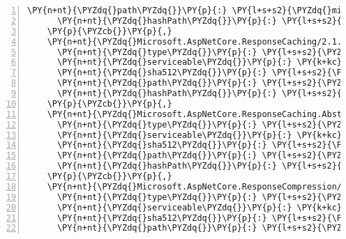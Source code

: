 \begin{Verbatim}[commandchars=\\\{\},numbers=left,firstnumber=1,stepnumber=1,numberblanklines=0]
      \PY{n+nt}{\PYZdq{}path\PYZdq{}}\PY{p}{:} \PY{l+s+s2}{\PYZdq{}microsoft.aspnetcore.razor.runtime/2.1.0\PYZhy{}rc1\PYZhy{}final\PYZdq{}}\PY{p}{,}
      \PY{n+nt}{\PYZdq{}hashPath\PYZdq{}}\PY{p}{:} \PY{l+s+s2}{\PYZdq{}microsoft.aspnetcore.razor.runtime.2.1.0\PYZhy{}rc1\PYZhy{}final.nupkg.sha512\PYZdq{}}
    \PY{p}{\PYZcb{}}\PY{p}{,}
    \PY{n+nt}{\PYZdq{}Microsoft.AspNetCore.ResponseCaching/2.1.0\PYZhy{}rc1\PYZhy{}final\PYZdq{}}\PY{p}{:} \PY{p}{\PYZob{}}
      \PY{n+nt}{\PYZdq{}type\PYZdq{}}\PY{p}{:} \PY{l+s+s2}{\PYZdq{}package\PYZdq{}}\PY{p}{,}
      \PY{n+nt}{\PYZdq{}serviceable\PYZdq{}}\PY{p}{:} \PY{k+kc}{true}\PY{p}{,}
      \PY{n+nt}{\PYZdq{}sha512\PYZdq{}}\PY{p}{:} \PY{l+s+s2}{\PYZdq{}sha512\PYZhy{}iGd5YsaPKBG5GvNAe3YwbBx6Q1BJUcCQHdq9n57qWkb+z+R8Dj1hXf94DpMLOw90IJtC0UFMkmOYIj6QCoo7Mg==\PYZdq{}}\PY{p}{,}
      \PY{n+nt}{\PYZdq{}path\PYZdq{}}\PY{p}{:} \PY{l+s+s2}{\PYZdq{}microsoft.aspnetcore.responsecaching/2.1.0\PYZhy{}rc1\PYZhy{}final\PYZdq{}}\PY{p}{,}
      \PY{n+nt}{\PYZdq{}hashPath\PYZdq{}}\PY{p}{:} \PY{l+s+s2}{\PYZdq{}microsoft.aspnetcore.responsecaching.2.1.0\PYZhy{}rc1\PYZhy{}final.nupkg.sha512\PYZdq{}}
    \PY{p}{\PYZcb{}}\PY{p}{,}
    \PY{n+nt}{\PYZdq{}Microsoft.AspNetCore.ResponseCaching.Abstractions/2.1.0\PYZhy{}rc1\PYZhy{}final\PYZdq{}}\PY{p}{:} \PY{p}{\PYZob{}}
      \PY{n+nt}{\PYZdq{}type\PYZdq{}}\PY{p}{:} \PY{l+s+s2}{\PYZdq{}package\PYZdq{}}\PY{p}{,}
      \PY{n+nt}{\PYZdq{}serviceable\PYZdq{}}\PY{p}{:} \PY{k+kc}{true}\PY{p}{,}
      \PY{n+nt}{\PYZdq{}sha512\PYZdq{}}\PY{p}{:} \PY{l+s+s2}{\PYZdq{}sha512\PYZhy{}bTL6Gzo+H75FYVx7Wfo1NC6D8bkE+BNiQp6d2Aa0nXJuYcGXyTYTgrDcOVKAFlPElPpUnihw9h15/UJoT5n9gA==\PYZdq{}}\PY{p}{,}
      \PY{n+nt}{\PYZdq{}path\PYZdq{}}\PY{p}{:} \PY{l+s+s2}{\PYZdq{}microsoft.aspnetcore.responsecaching.abstractions/2.1.0\PYZhy{}rc1\PYZhy{}final\PYZdq{}}\PY{p}{,}
      \PY{n+nt}{\PYZdq{}hashPath\PYZdq{}}\PY{p}{:} \PY{l+s+s2}{\PYZdq{}microsoft.aspnetcore.responsecaching.abstractions.2.1.0\PYZhy{}rc1\PYZhy{}final.nupkg.sha512\PYZdq{}}
    \PY{p}{\PYZcb{}}\PY{p}{,}
    \PY{n+nt}{\PYZdq{}Microsoft.AspNetCore.ResponseCompression/2.1.0\PYZhy{}rc1\PYZhy{}final\PYZdq{}}\PY{p}{:} \PY{p}{\PYZob{}}
      \PY{n+nt}{\PYZdq{}type\PYZdq{}}\PY{p}{:} \PY{l+s+s2}{\PYZdq{}package\PYZdq{}}\PY{p}{,}
      \PY{n+nt}{\PYZdq{}serviceable\PYZdq{}}\PY{p}{:} \PY{k+kc}{true}\PY{p}{,}
      \PY{n+nt}{\PYZdq{}sha512\PYZdq{}}\PY{p}{:} \PY{l+s+s2}{\PYZdq{}sha512\PYZhy{}bB5oOvNIWwwG50mZnzwaZID2uJpYbLpKk/iMwskbuOEOYDRUg2TtVJAUp/6eDmVb6jVnX7pwwB9EwqC2OEaQLw==\PYZdq{}}\PY{p}{,}
      \PY{n+nt}{\PYZdq{}path\PYZdq{}}\PY{p}{:} \PY{l+s+s2}{\PYZdq{}microsoft.aspnetcore.responsecompression/2.1.0\PYZhy{}rc1\PYZhy{}final\PYZdq{}}\PY{p}{,}

\end{Verbatim}

